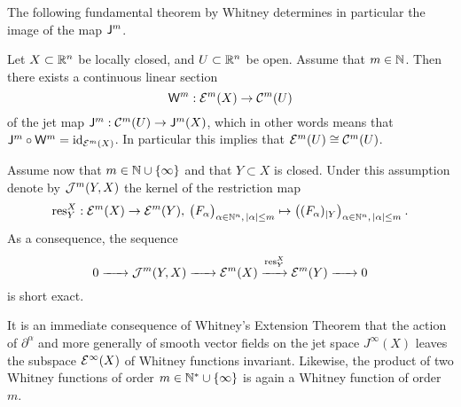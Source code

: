 The following fundamental theorem by Whitney 
determines in particular the image of the map $\mathsf{J}^m$. 

\begin{theorem}\label{WhitneyExtension}
 Let $X \subset \mathbb{R}^n$ be locally closed, and $U\subset \mathbb{R}^n$ be open. 
 Assume that $m\in \mathbb{N}$. Then there exists a continuous linear section
 \[
  \mathsf{W}^m : \mathcal{E}^m (X) \rightarrow \mathcal{C}^m (U) 
 \] 
 of the jet map $\mathsf{J}^m : \mathcal{C}^m (U) \rightarrow \mathsf{J}^m (X)$, which in other words
 means that $\mathsf{J}^m \circ \mathsf{W}^m = \operatorname{id}_{\mathcal{E}^m (X)}$. In particular this implies
 that $\mathcal{E}^m (U) \cong \mathcal{C}^m (U)$.

 Assume now that $m \in \mathbb{N} \cup \{ \infty \}$ and that $Y\subset X$ is closed. 
 Under this assumption denote by $\mathcal{J}^m (Y,X)$ the kernel of the restriction 
 map 
 \[
      \operatorname{res}^X_Y : \mathcal{E}^m (X) \rightarrow \mathcal{E}^m (Y), \: \big( F_\alpha \big)_{\alpha \in \mathbb{N}^n, \, |\alpha| \leq m}
      \mapsto \big( (F_\alpha)_{|Y} \big)_{\alpha \in \mathbb{N}^n, \, |\alpha| \leq m} \: . 
 \]
 As a consequence, the sequence 
 \[
  0 \xrightarrow{\hspace{1.5em}} \mathcal{J}^m(Y,X) 
    \xrightarrow{\hspace{1.5em}} \mathcal{E}^m (X) 
    \overset{\operatorname{res}^X_Y}{\xrightarrow{\hspace{1.5em}}} 
    \mathcal{E}^m (Y) \xrightarrow{\hspace{1.5em}} 0
 \]
 is short exact.
\end{theorem}

It is an immediate consequence of Whitney's Extension Theorem that the action of 
$\partial^\alpha$ and more generally of smooth vector fields on the jet space $J^\infty (X)$ leaves the 
subspace $\mathcal{E}^\infty (X)$ of Whitney functions invariant.
Likewise, the product of two Whitney functions of order $m \in \mathbb{N}^*\cup \{ \infty \}$ 
is again a Whitney function of order $m$.  
\vspace{2mm}

